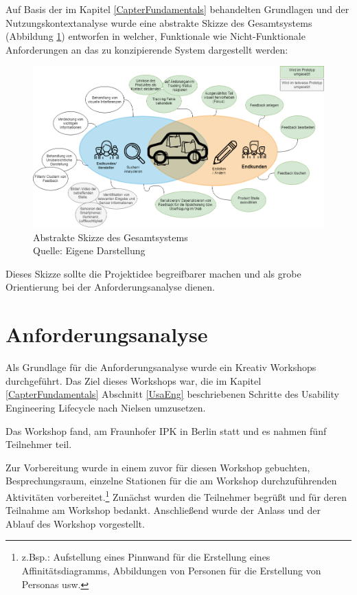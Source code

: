 Auf Basis der im Kapitel \ref{CapterFundamentals} behandelten Grundlagen und der Nutzungskontextanalyse wurde eine abstrakte Skizze des Gesamtsystems (Abbildung \ref{img:sysstem_sketch}) entworfen in welcher, 
Funktionale wie Nicht-Funktionale Anforderungen an das zu konzipierende System dargestellt werden:

\begin{figure}[H]
	\centering
	\includegraphics[width=1.0\textwidth]{resources/conception/SystemSkizze.png}
	\caption{Abstrakte Skizze des Gesamtsystems \\Quelle: Eigene Darstellung}
	\label{img:sysstem_sketch}
\end{figure}

Dieses Skizze sollte die Projektidee begreifbarer machen und als grobe Orientierung bei der Anforderungsanalyse dienen.

\section{Anforderungsanalyse}

Als Grundlage für die Anforderungsanalyse wurde ein Kreativ Workshops durchgeführt. Das Ziel dieses Workshops war, die im Kapitel \ref{CapterFundamentals} Abschnitt \ref{UsaEng} beschriebenen Schritte des Usability Engineering Lifecycle nach Nielsen umzusetzen.   

Das Workshop fand, am Fraunhofer IPK in Berlin statt und es nahmen fünf Teilnehmer teil. %

Zur Vorbereitung wurde in einem zuvor für diesen Workshop gebuchten, Besprechungsraum, einzelne Stationen für die am Workshop durchzuführenden Aktivitäten vorbereitet.\footnote{z.Bsp.: Aufstellung eines Pinnwand für die Erstellung eines Affinitätsdiagramms, Abbildungen von Personen für die Erstellung von Personas usw.} Zunächst wurden die Teilnehmer begrüßt und für deren Teilnahme am Workshop bedankt. 
Anschließend wurde der Anlass und der Ablauf des Workshop vorgestellt. 

